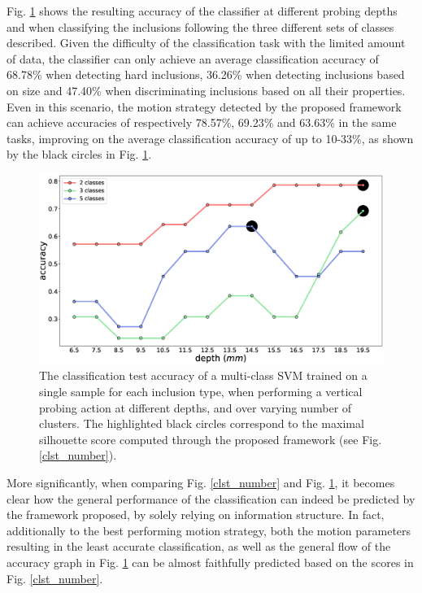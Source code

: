 Fig. \ref{svm_acc} shows the resulting accuracy of the classifier at different probing depths and when classifying the inclusions following the three different sets of classes described. 
Given the difficulty of the classification task with the limited amount of data, the classifier can only achieve an average classification accuracy of 68.78\% when detecting hard inclusions,  36.26\% when detecting inclusions based on size and 47.40\% when discriminating inclusions based on all their properties. Even in this scenario, the motion strategy detected by the proposed framework can achieve accuracies of respectively 78.57\%, 69.23\% and 63.63\% in the same tasks, improving on the average classification accuracy of up to 10-33\%, as shown by the black circles in Fig. \ref{svm_acc}.
\begin{figure}[]
	\centering
	\includegraphics[width=\columnwidth]{./figs/bar_clst_num_change_svm.eps}
	\caption{The classification test accuracy of a multi-class SVM trained on a single sample for each inclusion type, when performing a vertical probing action at different depths, and over varying number of  clusters. The highlighted black circles correspond to the maximal silhouette score computed through the proposed framework (see Fig. \ref{clst_number}).}
	\label{svm_acc}
\end{figure}
More significantly, when comparing Fig. \ref{clst_number} and Fig. \ref{svm_acc}, it becomes clear how the general performance of the classification can indeed be predicted by the framework proposed, by solely relying on information structure. In fact, additionally to the best performing motion strategy, both the motion parameters resulting in the least accurate classification, as well as the general flow of the accuracy graph in Fig. \ref{svm_acc} can be almost faithfully predicted based on the scores in Fig. \ref{clst_number}.


